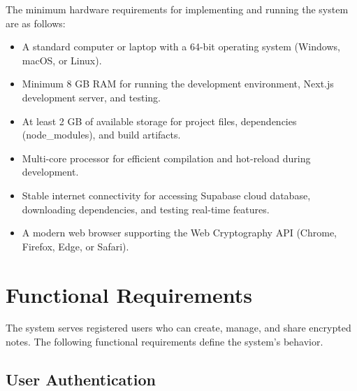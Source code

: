 The minimum hardware requirements for implementing and running the system are as follows:

\begin{itemize}
    \item A standard computer or laptop with a 64-bit operating system (Windows, macOS, or Linux).
    \item Minimum 8 GB RAM for running the development environment, Next.js development server, and testing.
    \item At least 2 GB of available storage for project files, dependencies (node\_modules), and build artifacts.
    \item Multi-core processor for efficient compilation and hot-reload during development.
    \item Stable internet connectivity for accessing Supabase cloud database, downloading dependencies, and testing real-time features.
    \item A modern web browser supporting the Web Cryptography API (Chrome, Firefox, Edge, or Safari).
\end{itemize}

\section{Functional Requirements}

The system serves registered users who can create, manage, and share encrypted notes. The following functional requirements define the system's behavior.

\subsection{User Authentication}

